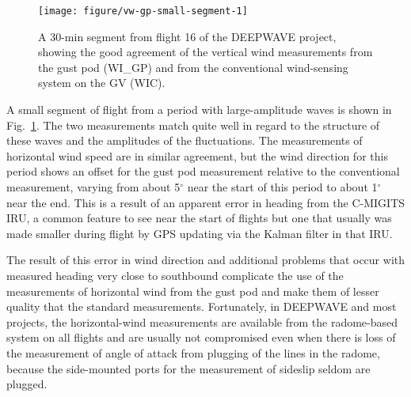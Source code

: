 \documentclass[12pt,twoside,english]{article}\usepackage[]{graphicx}\usepackage[]{color}
\newenvironment{knitrout}{}{} %
\begin{document}
\begin{knitrout}
\color{fgcolor}\begin{figure}
\texttt{[image: figure/vw-gp-small-segment-1]} \caption[A 30-min segment from flight 16 of the DEEPWAVE project, showing the good agreement of the vertical wind measurements from the gust pod (WI\_GP) and from the conventional wind-sensing system on the GV (WIC)]{A 30-min segment from flight 16 of the DEEPWAVE project, showing the good agreement of the vertical wind measurements from the gust pod (WI\_GP) and from the conventional wind-sensing system on the GV (WIC).}\label{fig:vw-gp-small-segment}
\end{figure}


\end{knitrout}

A small segment of flight from a period with large-amplitude waves is shown in Fig.~\ref{fig:vw-gp-small-segment}. The two measurements match quite well in regard to the structure of these waves and the amplitudes of the fluctuations. The measurements of horizontal wind speed are in similar agreement, but the wind direction for this period shows an offset for the gust pod measurement relative to the conventional measurement, varying from about 5$^{\circ}$ near the start of this period to about 1$^{\circ}$ near the end. This is a result of an apparent error in heading from the C-MIGITS IRU, a common feature to see near the start of flights but one that usually was made smaller during flight by GPS updating via the Kalman filter in that IRU. 

The result of this error in wind direction and additional problems that occur with measured heading very close to southbound complicate the use of the measurements of horizontal wind from the gust pod and make them of lesser quality that the standard measurements. Fortunately, in DEEPWAVE and most projects, the horizontal-wind measurements are available from the radome-based system on all flights and are usually not compromised even when there is loss of the measurement of angle of attack from plugging of the lines in the radome, because the side-mounted ports for the measurement of sideslip seldom are plugged. 
\end{document}
